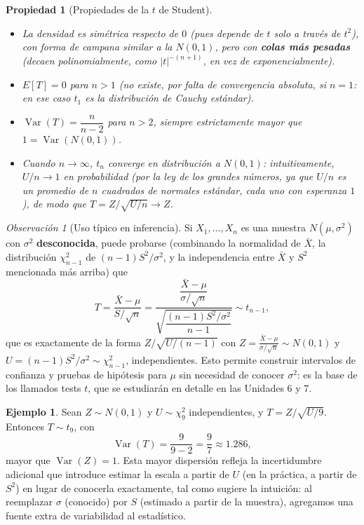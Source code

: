 \documentclass[11pt,a4paper]{article}
\theoremstyle{plain}
\newtheorem{propiedad}[teorema]{Propiedad}
\theoremstyle{definition}
\newtheorem{ejemplo}[teorema]{Ejemplo}
\theoremstyle{remark}
\newtheorem{observacion}[teorema]{Observación}
\begin{document}
\begin{propiedad}[Propiedades de la $t$ de Student]
\begin{itemize}
\item La densidad es simétrica respecto de $0$ (pues depende de $t$ solo a través de $t^2$), con forma de campana similar a la $N(0,1)$, pero con \textbf{colas más pesadas} (decaen polinomialmente, como $|t|^{-(n+1)}$, en vez de exponencialmente).
\item $E[T]=0$ para $n>1$ (no existe, por falta de convergencia absoluta, si $n=1$: en ese caso $t_1$ es la distribución de Cauchy estándar).
\item $\operatorname{Var}(T) = \dfrac{n}{n-2}$ para $n>2$, siempre estrictamente mayor que $1=\operatorname{Var}(N(0,1))$.
\item Cuando $n\to\infty$, $t_n$ converge en distribución a $N(0,1)$: intuitivamente, $U/n\to1$ en probabilidad (por la ley de los grandes números, ya que $U/n$ es un promedio de $n$ cuadrados de normales estándar, cada uno con esperanza $1$), de modo que $T=Z/\sqrt{U/n}\to Z$.
\end{itemize}
\end{propiedad}

\begin{observacion}[Uso típico en inferencia]
Si $X_1,\dots,X_n$ es una muestra $N(\mu,\sigma^2)$ con $\sigma^2$ \textbf{desconocida}, puede probarse (combinando la normalidad de $\bar X$, la distribución $\chi_{n-1}^2$ de $(n-1)S^2/\sigma^2$, y la independencia entre $\bar X$ y $S^2$ mencionada más arriba) que
\[
T = \frac{\bar X-\mu}{S/\sqrt n} = \frac{\dfrac{\bar X-\mu}{\sigma/\sqrt n}}{\sqrt{\dfrac{(n-1)S^2/\sigma^2}{n-1}}} \sim t_{n-1},
\]
que es exactamente de la forma $Z/\sqrt{U/(n-1)}$ con $Z=\frac{\bar X-\mu}{\sigma/\sqrt n}\sim N(0,1)$ y $U=(n-1)S^2/\sigma^2\sim\chi_{n-1}^2$, independientes. Esto permite construir intervalos de confianza y pruebas de hipótesis para $\mu$ sin necesidad de conocer $\sigma^2$: es la base de los llamados tests $t$, que se estudiarán en detalle en las Unidades 6 y 7.
\end{observacion}

\begin{ejemplo}
Sean $Z\sim N(0,1)$ y $U\sim\chi_9^2$ independientes, y $T=Z/\sqrt{U/9}$. Entonces $T\sim t_9$, con
\[
\operatorname{Var}(T) = \frac{9}{9-2} = \frac97 \approx 1.286,
\]
mayor que $\operatorname{Var}(Z)=1$. Esta mayor dispersión refleja la incertidumbre adicional que introduce estimar la escala a partir de $U$ (en la práctica, a partir de $S^2$) en lugar de conocerla exactamente, tal como sugiere la intuición: al reemplazar $\sigma$ (conocido) por $S$ (estimado a partir de la muestra), agregamos una fuente extra de variabilidad al estadístico.
\end{ejemplo}
\end{document}
